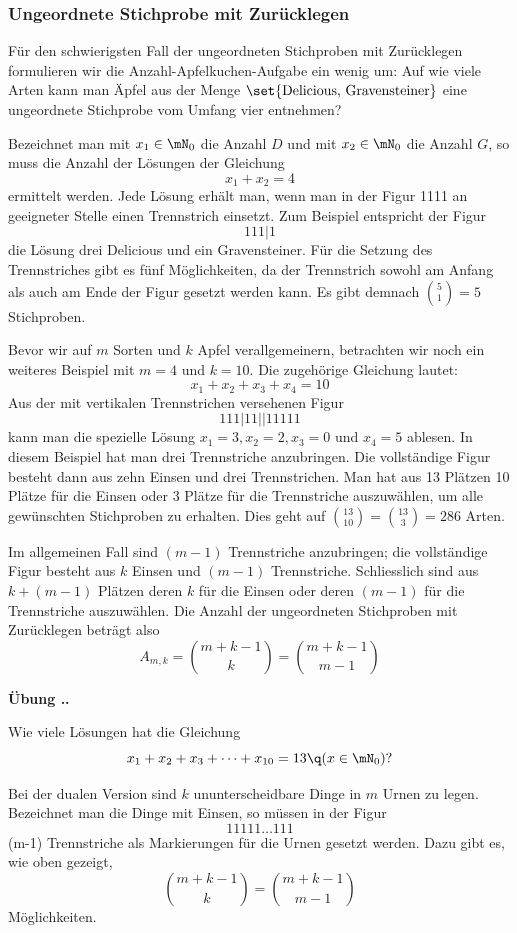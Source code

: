 \documentclass[%
11pt,%
twoside,%
titlepage,%
german,%
headsepline%
]{scrartcl}
\newcommand{\faEyeLightGray}{\textcolor{lightgray}{\faEye}} %
\newcommand{\concatueb}[1]{ueb:#1}%
\newcommand{\concatlsg}[1]{lsg:#1}%
\newcounter{uebcounter}[section]
\renewcommand{\theuebcounter}{\thesection.\arabic{uebcounter}}  %
\newenvironment{uebenv}[1]{%
    \refstepcounter{uebcounter}
    \par\noindent\textbf{Übung \theuebcounter.}%
    \label{\concatueb{#1}}\hfill\hyperref[\concatlsg{#1}]{\faEyeLightGray}\newline
}{%
    \par
}
\begin{document}
\subsubsection{Ungeordnete Stichprobe mit Zurücklegen}
Für den schwierigsten Fall der ungeordneten Stichproben mit Zurücklegen formulieren wir die Anzahl-Apfelkuchen-Aufgabe ein wenig um: Auf wie viele Arten kann man \"Apfel aus der Menge $\set{\text{Delicious, Gravensteiner}}$ eine ungeordnete Stichprobe vom Umfang vier entnehmen?

Bezeichnet man mit $x_1\in\mN_0$ die Anzahl $D$ und mit $x_2\in\mN_0$ die Anzahl $G$, so muss die Anzahl der Lösungen der Gleichung $$x_1+x_2=4$$ ermittelt werden. Jede Lösung erhält man, wenn man in der Figur 1111 an geeigneter Stelle einen Trennstrich einsetzt. Zum Beispiel entspricht der Figur $$111|1$$ die Lösung drei Delicious und ein Gravensteiner. Für die Setzung des Trennstriches gibt es fünf Möglichkeiten, da der Trennstrich sowohl am Anfang als auch am Ende der Figur gesetzt werden kann. Es gibt demnach $\binom{5}{1}=5$ Stichproben.

Bevor wir auf $m$ Sorten und $k$ Apfel verallgemeinern, betrachten wir noch ein weiteres Beispiel mit $m=4$ und $k=10$. Die zugehörige Gleichung lautet: $$x_1+x_2+x_3+x_4=10$$ Aus der mit vertikalen Trennstrichen versehenen Figur $$111|11||11111$$ kann man die spezielle Lösung $x_1 = 3, x_2 = 2, x_3 = 0$ und $x_4 = 5$ ablesen. In diesem Beispiel hat man drei Trennstriche anzubringen. Die vollständige Figur besteht dann aus zehn Einsen und drei Trennstrichen. Man hat aus 13 Plätzen 10 Plätze für die Einsen oder 3 Plätze für die Trennstriche
auszuwählen, um alle gewünschten Stichproben zu erhalten. Dies geht auf $\binom{13}{10}=\binom{13}{3}=286$ Arten.

Im allgemeinen Fall sind $(m-1)$ Trennstriche anzubringen; die vollständige Figur besteht aus $k$ Einsen und $(m-1)$ Trennstriche. Schliesslich sind aus $k+(m-1)$ Plätzen deren $k$ für die Einsen oder deren $(m-1)$ für die Trennstriche auszuwählen.
Die Anzahl der ungeordneten Stichproben mit Zurücklegen beträgt also
$$A_{m,k}=\binom{m+k-1}{k}=\binom{m+k-1}{m-1}$$

\begin{uebenv}{zehnunbekannte}
Wie viele Lösungen hat die Gleichung
$$x_1+x_2+x_3+\dots+x_{10}=13\q (x\in\mN_0)?$$
\end{uebenv}



Bei der dualen Version sind $k$ ununterscheidbare Dinge in $m$ Urnen zu legen. Bezeichnet man die Dinge mit Einsen, so müssen in der Figur
$$11111\dots111$$
(m-1) Trennstriche als Markierungen für die Urnen gesetzt werden. Dazu gibt es, wie oben gezeigt,
$$\binom{m+k-1}{k}=\binom{m+k-1}{m-1}$$
Möglichkeiten.
\end{document}
